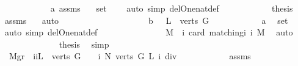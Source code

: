 \begin{isabellebody}
\ \ \ \ \ \ \ \ \ \ \isamarkupfalse%
\ a\ assms\ \isamarkupfalse%
\ \ {\isachardoublequoteopen}{\isacharquery}set{}{}\ {\isacharequal}\ {\isacharbraceleft}{}{\isacharbraceright}{\isachardoublequoteclose}\ \isamarkupfalse%
\ {\isacharparenleft}auto\ simp\ del{\isacharcolon}One{\isacharunderscore}nat{\isacharunderscore}def{\isacharparenright}\isanewline
\ \ \ \ \ \ \ \ \ \ \isamarkupfalse%
\ {\isacharquery}thesis\ \isamarkupfalse%
\ assms\ {}\ \isamarkupfalse%
\ auto\isanewline
\ \ \ \ \ \ \ \ \isamarkupfalse%
\isanewline
\ \ \ \ \ \ \ \ \ \ \isamarkupfalse%
\ b{\isacharcolon}\ {\isachardoublequoteopen}{}\ {\isasymnotin}\ L\ {\isacharbackquote}\ verts\ G{\isachardoublequoteclose}\isanewline
\ \ \ \ \ \ \ \ \ \ \isamarkupfalse%
\ a\ \isamarkupfalse%
\ {\isachardoublequoteopen}{\isacharquery}set{}{}\ {\isacharequal}\ {\isacharbraceleft}{\isacharbraceright}{\isachardoublequoteclose}\ \isamarkupfalse%
\ {\isacharparenleft}auto\ simp\ del{\isacharcolon}One{\isacharunderscore}nat{\isacharunderscore}def{\isacharparenright}\isanewline
\ \ \ \ \ \ \ \ \ \ \ \ \isamarkupfalse%
\ \isamarkupfalse%
\ {\isachardoublequoteopen}{\isacharquery}M{}{}\ {\isacharequal}\ {\isacharparenleft}{\isasymSum}i{\isasymin}{\isacharbraceleft}{\isacharbraceright}{\isachardot}\ card\ {\isacharparenleft}matching{\isacharunderscore}i\ i\ M{\isacharparenright}{\isacharparenright}{\isachardoublequoteclose}\ \isamarkupfalse%
\ auto\isanewline
\ \ \ \ \ \ \ \ \ \ \ \ \isamarkupfalse%
\ {\isacharquery}thesis\ \isamarkupfalse%
\ simp\isanewline
\ \ \ \ \ \ \ \ \ \ \isamarkupfalse%
\isanewline
\ \ \ \ \ \ \ \ \isamarkupfalse%
\isanewline
\ \ \ \ \ \ \isamarkupfalse%
\isanewline
\ \ \ \ \ \ \isamarkupfalse%
\ {}{\isacharcolon}\ {\isachardoublequoteopen}{\isacharquery}Mgr{}\ {\isasymle}\ {\isacharparenleft}{\isasymSum}i{\isacharbar}i{\isasymin}L\ {\isacharbackquote}\ verts\ G\ {\isasymand}\ {}\ {\isacharless}\ i{\isachardot}\ N\ {\isacharparenleft}verts\ G{\isacharparenright}\ L\ i\ div\ {}{\isacharparenright}{\isachardoublequoteclose}\ \isanewline
\ \ \ \ \ \ \ \ \isamarkupfalse%
\ assms\isanewline

\end{isabellebody}
